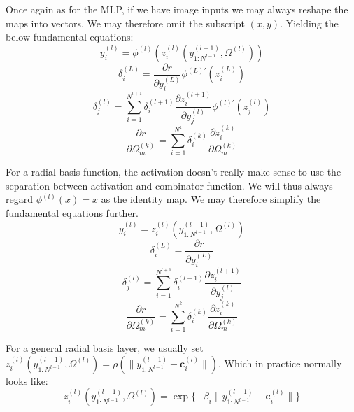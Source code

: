 \documentclass[a4paper,10pt]{article}
\theoremstyle{definition}
\begin{document}
Once again as for the MLP, if we have image inputs we may always reshape the maps into vectors. We may therefore omit the subscript $(x,y)$. Yielding the below fundamental equations:
\begin{equation}
y_i^{(l)} = \phi^{(l)}(z^{(l)}_{i}(y^{(l-1)}_{1:N^{l-1}}, \Omega^{(l)}))
\end{equation}
\begin{equation}
\delta_i^{(L)} = \frac{\partial r}{\partial y^{(L)}_i}\phi^{(L)'}(z^{(L)}_{i})
\end{equation}
\begin{equation}
\delta_j^{(l)} = \sum_{i = 1}^{N^{l+1}} \delta^{(l+1)}_i \frac{\partial z^{(l + 1)}_{i}}{\partial y^{(l)}_j} \phi^{(l)'}(z^{(l)}_{j})
\end{equation}
\begin{equation}
\frac{\partial r}{\partial \Omega^{(k)}_m} = \sum_{i = 1}^{N^{k}}\delta_i^{(k)} \frac{\partial z^{(k)}_i}{\partial \Omega^{(k)}_m}
\end{equation}

For a radial basis function, the activation doesn't really make sense to use the separation between activation and combinator function. We will thus always regard $\phi^{(l)}(x) = x$ as the identity map. We may therefore simplify the fundamental equations further.
\begin{equation}
y_i^{(l)} = z^{(l)}_{i}(y^{(l-1)}_{1:N^{l-1}}, \Omega^{(l)})
\end{equation}
\begin{equation}
\delta_i^{(L)} = \frac{\partial r}{\partial y^{(L)}_i}
\end{equation}
\begin{equation}
\delta_j^{(l)} = \sum_{i = 1}^{N^{l+1}} \delta^{(l+1)}_i \frac{\partial z^{(l + 1)}_{i}}{\partial y^{(l)}_j}
\end{equation}
\begin{equation}
\frac{\partial r}{\partial \Omega^{(k)}_m} = \sum_{i = 1}^{N^{k}}\delta_i^{(k)} \frac{\partial z^{(k)}_i}{\partial \Omega^{(k)}_m}
\end{equation}

For a general radial basis layer, we usually set\\ $z^{(l)}_{i}(y^{(l-1)}_{1:N^{l-1}}, \Omega^{(l)}) = \rho(\|y^{(l-1)}_{1:N^{l-1}} - \pmb{c}_i^{(l)}\|)$. Which in practice normally looks like: 
\begin{equation}
z^{(l)}_{i}(y^{(l-1)}_{1:N^{l-1}}, \Omega^{(l)}) = \exp\{ -\beta_i\|y^{(l-1)}_{1:N^{l-1}} - \pmb{c}_i^{(l)}\| \}
\end{equation}
\end{document}
